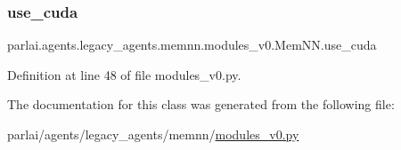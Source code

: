\subsubsection{\texorpdfstring{use\+\_\+cuda}{use\_cuda}}
{\footnotesize\ttfamily parlai.\+agents.\+legacy\+\_\+agents.\+memnn.\+modules\+\_\+v0.\+Mem\+N\+N.\+use\+\_\+cuda}



Definition at line 48 of file modules\+\_\+v0.\+py.



The documentation for this class was generated from the following file\+:\begin{DoxyCompactItemize}
\item 
parlai/agents/legacy\+\_\+agents/memnn/\hyperlink{memnn_2modules__v0_8py}{modules\+\_\+v0.\+py}\end{DoxyCompactItemize}
